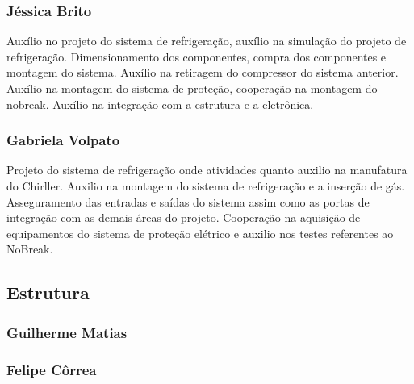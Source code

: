 \begin{apendicesenv}
\subsubsection{Jéssica Brito}

Auxílio no projeto do sistema de refrigeração,
auxílio na simulação do projeto de refrigeração. 
Dimensionamento dos componentes, compra dos componentes e montagem do sistema. 
Auxílio na retiragem do compressor do sistema anterior. 
Auxílio na montagem do sistema de proteção, cooperação na montagem do nobreak.
Auxílio na integração com a estrutura e a eletrônica.

\subsubsection{Gabriela Volpato}

Projeto do sistema de refrigeração onde atividades quanto auxilio na manufatura do Chirller.
Auxilio na montagem do sistema de refrigeração e a inserção de gás. 
Asseguramento das entradas e saídas do sistema assim como as portas de integração com as 
demais áreas do projeto. Cooperação na aquisição de equipamentos do sistema de proteção 
elétrico e auxilio nos testes referentes ao NoBreak.

\subsection{Estrutura}

\subsubsection{Guilherme Matias}

\subsubsection{Felipe Côrrea}

\noindent

\end{apendicesenv}
